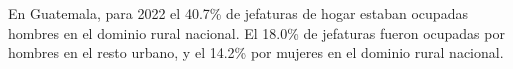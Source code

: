 En Guatemala, para 2022 el 40.7\% de jefaturas de hogar estaban ocupadas hombres en el dominio rural nacional. El 18.0\% de jefaturas fueron ocupadas por hombres en el resto urbano, y el 14.2\% por mujeres en el dominio rural nacional. 